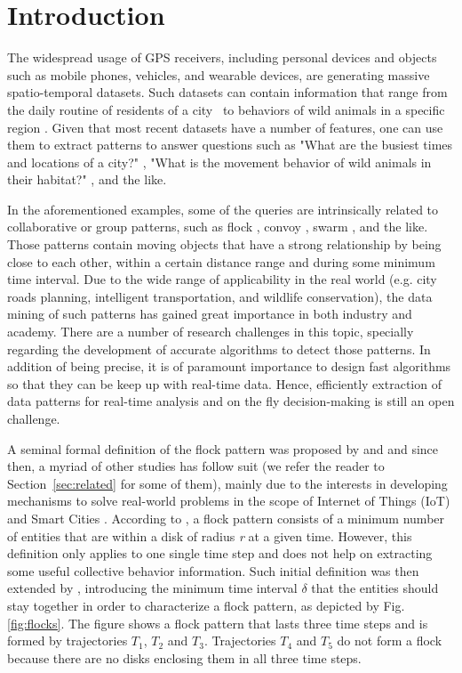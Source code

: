 \chapter{Introduction}
\label{chp:introduction}
The widespread usage of GPS receivers, including personal devices and objects such as mobile phones, vehicles, and
wearable devices, are generating massive spatio-temporal datasets. Such datasets can contain information that range from
the daily routine of residents of a city~\citep{whatdidyoudo} to behaviors of wild animals in a specific region
\cite{bib:trajclustering}\cite{bib:miningperiodic}. Given that most recent datasets have a number of features, one can
use them to extract patterns to answer questions such as "What are the busiest times and locations of a city?"
\cite{bib:smartcities}\cite{bib:visualtrafficjam}, "What is the movement behavior of wild animals in their habitat?"
\cite{bib:movemine}, and the like.

In the aforementioned examples, some of the  queries are intrinsically related to collaborative or group patterns, such
as flock \cite{bib:gudefficient}, convoy \cite{bib:convoy}, swarm \cite{bib:swarm}, and the like. Those patterns
contain moving objects that have a strong relationship by being close to each other, within a certain distance range and
during some minimum time interval. Due to the wide range of applicability in the real world (e.g. city roads planning,
intelligent transportation, and wildlife conservation), the data mining of such patterns has gained great importance in
both industry and academy. There are a number of research challenges in this topic, specially regarding the development
of accurate algorithms to detect those patterns. In addition of being precise, it is of paramount importance to design
fast algorithms so that they can be keep up with real-time data. Hence, efficiently extraction of data patterns for
real-time analysis and on the fly decision-making is still an open challenge.

A seminal formal definition of the flock pattern was proposed by \cite{bib:remo} and \cite{bib:gudefficient} and since
then, a myriad of other studies has follow suit (we refer the reader to Section~\ref{sec:related} for some of them),
mainly due to the interests in developing mechanisms to solve real-world problems in the scope of Internet of Things
(IoT) \cite{bib:iot} and Smart Cities \cite{bib:smartcities}. According to \cite{bib:gudefficient}, a flock pattern
consists of a minimum number of entities that are within a disk of radius \textit{r} at a given time. However, this
definition only applies to one single time step and does not help on extracting some useful collective behavior
information. Such initial definition was then extended by \cite{bib:gudreportingflock}, introducing the minimum time
interval $\delta$ that the entities should stay together in order to characterize a flock pattern, as depicted by Fig.
\ref{fig:flocks}. The figure shows a flock pattern that lasts three time steps and is formed by trajectories $T_1$,
$T_2$ and $T_3$. Trajectories $T_4$ and $T_5$ do not form a flock because there are no disks enclosing them in all three
time steps.

